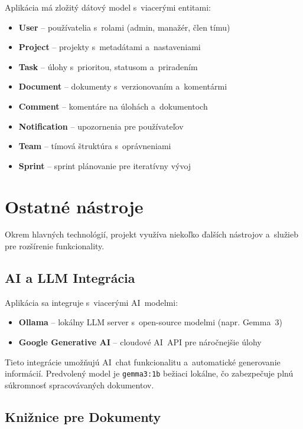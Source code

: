         Aplikácia má zložitý dátový model s~viacerými entitami:

\begin{itemize}
  \item \textbf{User} -- používatelia s~rolami (admin, manažér, člen tímu)
  \item \textbf{Project} -- projekty s~metadátami a~nastaveniami
  \item \textbf{Task} -- úlohy s~prioritou, statusom a~priradením
  \item \textbf{Document} -- dokumenty s~verzionovaním a~komentármi
  \item \textbf{Comment} -- komentáre na úlohách a~dokumentoch
  \item \textbf{Notification} -- upozornenia pre používateľov
  \item \textbf{Team} -- tímová štruktúra s~oprávneniami
  \item \textbf{Sprint} -- sprint plánovanie pre iteratívny vývoj
\end{itemize}

\section{Ostatné nástroje}

        Okrem hlavných technológií, projekt využíva niekoľko ďalších nástrojov a~služieb
pre rozšírenie funkcionality.

\subsection{AI a LLM Integrácia}

        Aplikácia sa integruje s~viacerými AI~modelmi:

\begin{itemize}
  \item \textbf{Ollama} -- lokálny LLM server s~open-source modelmi (napr. Gemma~3)
  \item \textbf{Google Generative AI} -- cloudové AI~API pre náročnejšie úlohy
\end{itemize}

        Tieto integrácie umožňujú AI~chat funkcionalitu a~automatické generovanie informácií.
Predvolený model je \texttt{gemma3:1b} bežiaci lokálne, čo zabezpečuje plnú súkromnosť
spracovávaných dokumentov.

\subsection{Knižnice pre Dokumenty}

